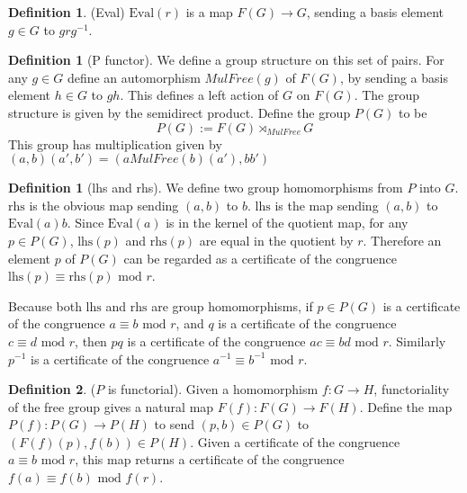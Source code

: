 \documentclass[11pt]{article} %
\theoremstyle{definition}
\theoremstyle{definition}
\theoremstyle{definition}
\theoremstyle{definition}
\theoremstyle{definition}
\newtheorem{defn}[theorem]{Definition}
\theoremstyle{definition}
\newtheorem{subdef}{Definition}[theorem]
\begin{document}

\begin{defn}(Eval)
  $\text{Eval}(r)$ is a map $F(G) \to G$, sending a basis element $g \in G$ to $grg^{-1}$.
\end{defn}

\begin{defn}[P functor]
  We define a group structure on this set of pairs.
  For any $g \in G$ define an automorphism $MulFree(g)$ of $F(G)$, by sending a basis
  element $h \in G$ to $gh$. This defines a left action of $G$ on $F(G)$. The group
  structure is given by the semidirect product. Define the group $P(G)$ to be
  \begin{equation}
  P(G) := F(G) \rtimes_{MulFree} G
  \end{equation}
  This group has multiplication given by $(a, b) (a', b') = (a MulFree(b)(a'), bb')$
\end{defn}

\begin{subdef}[lhs and rhs]
We define two group homomorphisms from $P$ into $G$. $\text{rhs}$ is the obvious map sending $(a, b)$ to $b$.
$\text{lhs}$ is the map sending $(a,b)$ to $\text{Eval}(a)b$.
Since $\text{Eval}(a)$ is in the kernel of the quotient map,
for any $p\in P(G)$, $\text{lhs}(p)$ and $\text{rhs}(p)$ are equal in the quotient by $r$.
Therefore an element $p$ of $P(G)$ can be regarded as a certificate of the congruence
$\text{lhs}(p) \equiv \text{rhs}(p) \text{ mod } r$.
\end{subdef}

Because both $\text{lhs}$ and $\text{rhs}$ are group homomorphisms, if $p \in P(G)$ is a certificate
of the congruence $a \equiv b \text{ mod } r$, and $q$ is a certificate of the congruence
$c \equiv d \text{ mod } r$, then $pq$ is a certificate of the congruence $ac \equiv bd \text{ mod } r$.
Similarly $p^{-1}$ is a certificate of the congruence $a^{-1} \equiv b^{-1} \text{ mod } r$.

\begin{subdef}($P$ is functorial).
  Given a homomorphism $f : G \to H$,
  functoriality of the free group gives a natural map $F(f) : F(G) \to F(H)$.
  Define the map $P(f) : P(G) \to P(H)$ to send $(p, b) \in P(G)$ to $(F(f)(p), f(b)) \in P(H)$.
  Given a certificate of the congruence $a \equiv b \text{ mod } r$, this map returns
  a certificate of the congruence $f(a) \equiv f(b) \text{ mod } f(r)$.
\end{subdef}
\end{document}

